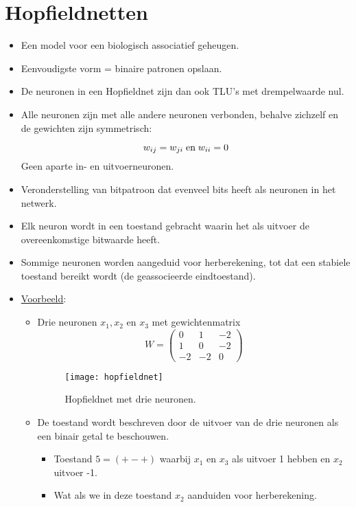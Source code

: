 \section{Hopfieldnetten}
\begin{itemize}
    \item Een model voor een biologisch associatief geheugen.
    \item Eenvoudigste vorm = binaire patronen opslaan.
    \item De neuronen in een Hopfieldnet zijn dan ook TLU's met drempelwaarde nul.
    \item Alle neuronen zijn met alle andere neuronen verbonden, behalve zichzelf en de gewichten zijn symmetrisch:

    $$w_{ij} = w_{ji} \; \hbox{en} \; w_{ii} = 0$$
    \alert Geen aparte in- en uitvoerneuronen.
    \item Veronderstelling van bitpatroon dat evenveel bits heeft als neuronen in het netwerk.
    \item Elk neuron wordt in een toestand gebracht waarin het als uitvoer de overeenkomstige bitwaarde heeft.
    \item Sommige neuronen worden aangeduid voor herberekening, tot dat een stabiele toestand bereikt wordt (de geassocieerde eindtoestand).
    \item \underline{Voorbeeld}:
    \begin{itemize}
        \item Drie neuronen $x_1, x_2$ en $x_3$ met gewichtenmatrix
        $$W = \begin{pmatrix}
            0 & 1 & -2 \\
            1 & 0 & -2 \\
            -2 & -2 & 0
        \end{pmatrix}$$
        \begin{figure}[ht]
            \centering
            \texttt{[image: hopfieldnet]}
            \caption{Hopfieldnet met drie neuronen.}
            \label{}
        \end{figure}
        \item De toestand wordt beschreven door de uitvoer van de drie neuronen als een binair getal te beschouwen. 
        \begin{itemize}
            \item Toestand $5 = (+ - +)$ waarbij $x_1$ en $x_3$ als uitvoer 1 hebben en $x_2$ uitvoer -1.
            \item Wat als we in deze toestand $x_2$ aanduiden voor herberekening.

\end{itemize}
\end{itemize}
\end{itemize}
